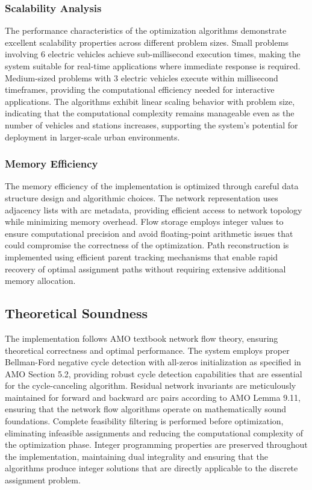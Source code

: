 \documentclass[12pt,a4paper]{article}
\begin{document}
\subsubsection{Scalability Analysis}

The performance characteristics of the optimization algorithms demonstrate excellent scalability properties across different problem sizes. Small problems involving 6 electric vehicles achieve sub-millisecond execution times, making the system suitable for real-time applications where immediate response is required. Medium-sized problems with 3 electric vehicles execute within millisecond timeframes, providing the computational efficiency needed for interactive applications. The algorithms exhibit linear scaling behavior with problem size, indicating that the computational complexity remains manageable even as the number of vehicles and stations increases, supporting the system's potential for deployment in larger-scale urban environments.

\subsubsection{Memory Efficiency}

The memory efficiency of the implementation is optimized through careful data structure design and algorithmic choices. The network representation uses adjacency lists with arc metadata, providing efficient access to network topology while minimizing memory overhead. Flow storage employs integer values to ensure computational precision and avoid floating-point arithmetic issues that could compromise the correctness of the optimization. Path reconstruction is implemented using efficient parent tracking mechanisms that enable rapid recovery of optimal assignment paths without requiring extensive additional memory allocation.

\subsection{Theoretical Soundness}

The implementation follows AMO textbook network flow theory, ensuring theoretical correctness and optimal performance. The system employs proper Bellman-Ford negative cycle detection with all-zeros initialization as specified in AMO Section 5.2, providing robust cycle detection capabilities that are essential for the cycle-canceling algorithm. Residual network invariants are meticulously maintained for forward and backward arc pairs according to AMO Lemma 9.11, ensuring that the network flow algorithms operate on mathematically sound foundations. Complete feasibility filtering is performed before optimization, eliminating infeasible assignments and reducing the computational complexity of the optimization phase. Integer programming properties are preserved throughout the implementation, maintaining dual integrality and ensuring that the algorithms produce integer solutions that are directly applicable to the discrete assignment problem.
\end{document}
